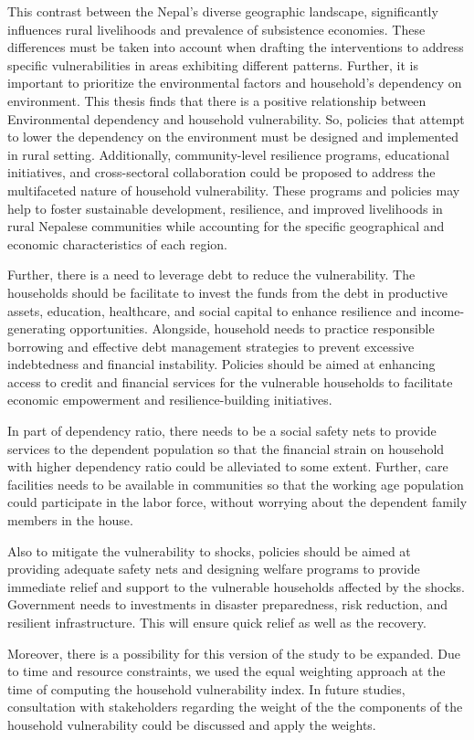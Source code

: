 This contrast between the Nepal's diverse geographic landscape, significantly influences rural livelihoods and prevalence of subsistence economies. These differences must be taken into account when drafting the interventions to address specific vulnerabilities in areas exhibiting different patterns. Further, it is important to prioritize the environmental factors and household's dependency on environment. This thesis finds that there is a positive relationship between Environmental dependency and household vulnerability. So, policies that attempt to lower the dependency on the environment must be designed and implemented in rural setting. Additionally, community-level resilience programs, educational initiatives, and cross-sectoral collaboration could be proposed to address the multifaceted nature of household vulnerability.  These programs and policies may help to foster sustainable development, resilience, and improved livelihoods in rural Nepalese communities while accounting for the specific geographical and economic characteristics of each region. 

Further, there is a need to leverage debt to reduce the vulnerability. The households should be facilitate to invest the funds from the debt in productive assets, education, healthcare, and social capital to enhance resilience and income-generating opportunities. Alongside, household needs to practice responsible borrowing and effective debt management strategies to prevent excessive indebtedness and financial instability. Policies should be aimed at enhancing access to credit and financial services for the vulnerable households to facilitate economic empowerment and resilience-building initiatives.

In part of dependency ratio, there needs to be a social safety nets to provide services to the dependent population so that the financial strain on household with higher dependency ratio could be alleviated to some extent. Further, care facilities needs to be available in communities so that the working age population could participate in the labor force, without worrying about the dependent family members in the house. 

Also to mitigate the vulnerability to shocks, policies should be aimed at providing adequate safety nets and designing welfare programs to provide immediate relief and support to the vulnerable households affected by the shocks. Government needs to investments in disaster preparedness, risk reduction, and resilient infrastructure. This will ensure quick relief as well as the recovery.   

Moreover, there is a possibility for this version of the study to be expanded. Due to time and resource constraints, we used the equal weighting approach at the time of computing the household vulnerability index. In future studies, consultation with stakeholders regarding the weight of the the components of the household vulnerability could be discussed and apply the weights.

